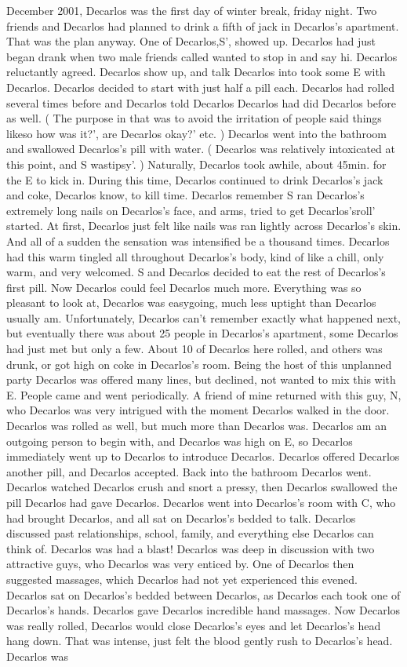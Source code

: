 \documentclass[12pt]{book}
\begin{document}
December 2001, Decarlos was the first day of winter break, friday night. Two friends and Decarlos had planned to drink a fifth of jack in Decarlos's apartment. That was the plan anyway. One of Decarlos,S', showed up. Decarlos had just began drank when two male friends called wanted to stop in and say hi. Decarlos reluctantly agreed. Decarlos show up, and talk Decarlos into took some E with Decarlos. Decarlos decided to start with just half a pill each. Decarlos had rolled several times before and Decarlos told Decarlos Decarlos had did Decarlos before as well. ( The purpose in that was to avoid the irritation of people said things likeso how was it?', are Decarlos okay?' etc. ) Decarlos went into the bathroom and swallowed Decarlos's pill with water. ( Decarlos was relatively intoxicated at this point, and S wastipsy'. ) Naturally, Decarlos took awhile, about 45min. for the E to kick in. During this time, Decarlos continued to drink Decarlos's jack and coke, Decarlos know, to kill time. Decarlos remember S ran Decarlos's extremely long nails on Decarlos's face, and arms, tried to get Decarlos'sroll' started. At first, Decarlos just felt like nails was ran lightly across Decarlos's skin. And all of a sudden the sensation was intensified be a thousand times. Decarlos had this warm tingled all throughout Decarlos's body, kind of like a chill, only warm, and very welcomed. S and Decarlos decided to eat the rest of Decarlos's first pill. Now Decarlos could feel Decarlos much more. Everything was so pleasant to look at, Decarlos was easygoing, much less uptight than Decarlos usually am. Unfortunately, Decarlos can't remember exactly what happened next, but eventually there was about 25 people in Decarlos's apartment, some Decarlos had just met but only a few. About 10 of Decarlos here rolled, and others was drunk, or got high on coke in Decarlos's room. Being the host of this unplanned party Decarlos was offered many lines, but declined, not wanted to mix this with E. People came and went periodically. A friend of mine returned with this guy, N, who Decarlos was very intrigued with the moment Decarlos walked in the door. Decarlos was rolled as well, but much more than Decarlos was. Decarlos am an outgoing person to begin with, and Decarlos was high on E, so Decarlos immediately went up to Decarlos to introduce Decarlos. Decarlos offered Decarlos another pill, and Decarlos accepted. Back into the bathroom Decarlos went. Decarlos watched Decarlos crush and snort a pressy, then Decarlos swallowed the pill Decarlos had gave Decarlos. Decarlos went into Decarlos's room with C, who had brought Decarlos, and all sat on Decarlos's bedded to talk. Decarlos discussed past relationships, school, family, and everything else Decarlos can think of. Decarlos was had a blast! Decarlos was deep in discussion with two attractive guys, who Decarlos was very enticed by. One of Decarlos then suggested massages, which Decarlos had not yet experienced this evened. Decarlos sat on Decarlos's bedded between Decarlos, as Decarlos each took one of Decarlos's hands. Decarlos gave Decarlos incredible hand massages. Now Decarlos was really rolled, Decarlos would close Decarlos's eyes and let Decarlos's head hang down. That was intense, just felt the blood gently rush to Decarlos's head. Decarlos was 
\end{document}
